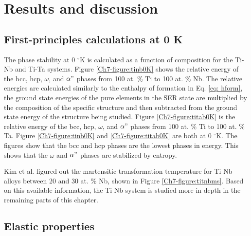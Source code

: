 \section{Results and discussion}

\subsection{First-principles calculations at 0 K}

The phase stability at 0 $^\circ$K is calculated as a function of composition for the Ti-Nb and Ti-Ta systems. Figure \ref{Ch7-figure:tinb0K} shows the relative energy of the bcc, hcp, $\omega$, and $\alpha"$ phases from 100 at. \% Ti to 100 at. \% Nb. The relative energies are calculated similarly to the enthalpy of formation in Eq. \ref{eq: hform}, the ground state energies of the pure elements in the SER state are multiplied by the composition of the specific structure and then subtracted from the ground state energy of the structure being studied. Figure \ref{Ch7-figure:titab0K} is the relative energy of the bcc, hcp, $\omega$, and $\alpha"$ phases from 100 at. \% Ti to 100 at. \% Ta. Figure \ref{Ch7-figure:tinb0K} and \ref{Ch7-figure:titab0K} are both at 0 $^\circ$K. The figures show that the bcc and hcp phases are the lowest phases in energy. This shows that the $\omega$ and $\alpha"$ phases are stabilized by entropy.

Kim et al.  \cite{Kim2006} figured out the martensitic transformation temperature for Ti-Nb alloys between 20 and 30 at. \% Nb, shown in Figure \ref{Ch7-figure:titnbms}. Based on this available information, the Ti-Nb system is studied more in depth in the remaining parts of this chapter. 

\subsection{Elastic properties}

